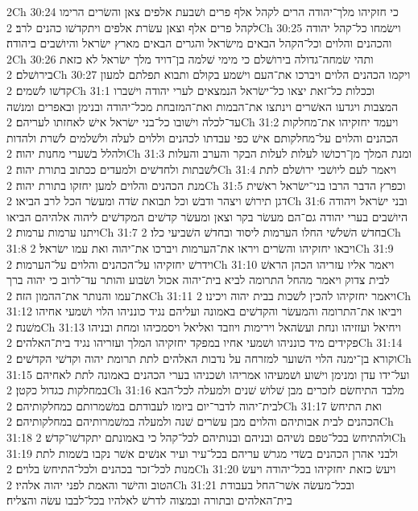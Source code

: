 2Ch 30:24  כי חזקיהו מלך־יהודה הרים לקהל אלף פרים ושׁבעת אלפים צאן והשׂרים הרימו לקהל פרים אלף וצאן עשׂרת אלפים ויתקדשׁו כהנים לרב׃
2Ch 30:25  וישׂמחו כל־קהל יהודה והכהנים והלוים וכל־הקהל הבאים מישׂראל והגרים הבאים מארץ ישׂראל והיושׁבים ביהודה׃
2Ch 30:26  ותהי שׂמחה־גדולה בירושׁלם כי מימי שׁלמה בן־דויד מלך ישׂראל לא כזאת בירושׁלם׃
2Ch 30:27  ויקמו הכהנים הלוים ויברכו את־העם וישׁמע בקולם ותבוא תפלתם למעון קדשׁו לשׁמים׃
2Ch 31:1  וככלות כל־זאת יצאו כל־ישׂראל הנמצאים לערי יהודה וישׁברו המצבות ויגדעו האשׁרים וינתצו את־הבמות ואת־המזבחת מכל־יהודה ובנימן ובאפרים ומנשׁה עד־לכלה וישׁובו כל־בני ישׂראל אישׁ לאחזתו לעריהם׃
2Ch 31:2  ויעמד יחזקיהו את־מחלקות הכהנים והלוים על־מחלקותם אישׁ כפי עבדתו לכהנים וללוים לעלה ולשׁלמים לשׁרת ולהדות ולהלל בשׁערי מחנות יהוה׃
2Ch 31:3  ומנת המלך מן־רכושׁו לעלות לעלות הבקר והערב והעלות לשׁבתות ולחדשׁים ולמעדים ככתוב בתורת יהוה׃
2Ch 31:4  ויאמר לעם ליושׁבי ירושׁלם לתת מנת הכהנים והלוים למען יחזקו בתורת יהוה׃
2Ch 31:5  וכפרץ הדבר הרבו בני־ישׂראל ראשׁית דגן תירושׁ ויצהר ודבשׁ וכל תבואת שׂדה ומעשׂר הכל לרב הביאו׃
2Ch 31:6  ובני ישׂראל ויהודה היושׁבים בערי יהודה גם־הם מעשׂר בקר וצאן ומעשׂר קדשׁים המקדשׁים ליהוה אלהיהם הביאו ויתנו ערמות ערמות׃
2Ch 31:7  בחדשׁ השׁלשׁי החלו הערמות ליסוד ובחדשׁ השׁביעי כלו׃
2Ch 31:8  ויבאו יחזקיהו והשׂרים ויראו את־הערמות ויברכו את־יהוה ואת עמו ישׂראל׃
2Ch 31:9  וידרשׁ יחזקיהו על־הכהנים והלוים על־הערמות׃
2Ch 31:10  ויאמר אליו עזריהו הכהן הראשׁ לבית צדוק ויאמר מהחל התרומה לביא בית־יהוה אכול ושׂבוע והותר עד־לרוב כי יהוה ברך את־עמו והנותר את־ההמון הזה׃
2Ch 31:11  ויאמר יחזקיהו להכין לשׁכות בבית יהוה ויכינו׃
2Ch 31:12  ויביאו את־התרומה והמעשׂר והקדשׁים באמונה ועליהם נגיד כונניהו הלוי ושׁמעי אחיהו משׁנה׃
2Ch 31:13  ויחיאל ועזזיהו ונחת ועשׂהאל וירימות ויוזבד ואליאל ויסמכיהו ומחת ובניהו פקידים מיד כונניהו ושׁמעי אחיו במפקד יחזקיהו המלך ועזריהו נגיד בית־האלהים׃
2Ch 31:14  וקורא בן־ימנה הלוי השׁוער למזרחה על נדבות האלהים לתת תרומת יהוה וקדשׁי הקדשׁים׃
2Ch 31:15  ועל־ידו עדן ומנימן וישׁוע ושׁמעיהו אמריהו ושׁכניהו בערי הכהנים באמונה לתת לאחיהם במחלקות כגדול כקטן׃
2Ch 31:16  מלבד התיחשׂם לזכרים מבן שׁלושׁ שׁנים ולמעלה לכל־הבא לבית־יהוה לדבר־יום ביומו לעבודתם במשׁמרותם כמחלקותיהם׃
2Ch 31:17  ואת התיחשׂ הכהנים לבית אבותיהם והלוים מבן עשׂרים שׁנה ולמעלה במשׁמרותיהם במחלקותיהם׃
2Ch 31:18  ולהתיחשׂ בכל־טפם נשׁיהם ובניהם ובנותיהם לכל־קהל כי באמונתם יתקדשׁו־קדשׁ׃
2Ch 31:19  ולבני אהרן הכהנים בשׂדי מגרשׁ עריהם בכל־עיר ועיר אנשׁים אשׁר נקבו בשׁמות לתת מנות לכל־זכר בכהנים ולכל־התיחשׂ בלוים׃
2Ch 31:20  ויעשׂ כזאת יחזקיהו בכל־יהודה ויעשׂ הטוב והישׁר והאמת לפני יהוה אלהיו׃
2Ch 31:21  ובכל־מעשׂה אשׁר־החל בעבודת בית־האלהים ובתורה ובמצוה לדרשׁ לאלהיו בכל־לבבו עשׂה והצליח׃
